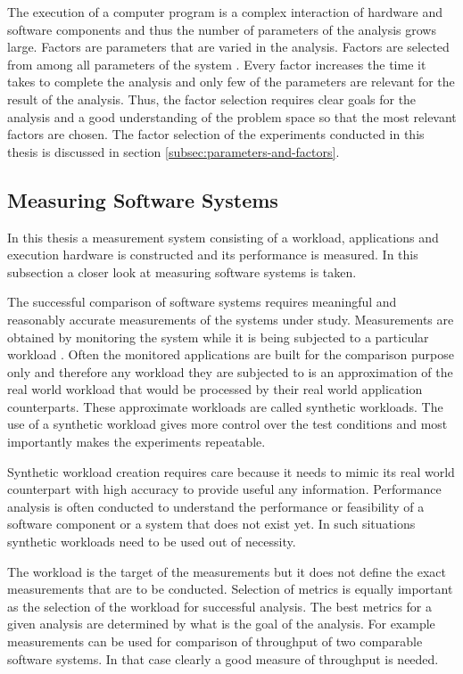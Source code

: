 The execution of a computer program is a complex interaction of hardware and software components and thus the number of parameters of the analysis grows large. Factors are parameters that are varied in the analysis. Factors are selected from among all parameters of the system \cite{jain1991art}. Every factor increases the time it takes to complete the analysis and only few of the parameters are relevant for the result of the analysis. Thus, the factor selection requires clear goals for the analysis and a good understanding of the problem space so that the most relevant factors are chosen. The factor selection of the experiments conducted in this thesis is discussed in section \ref{subsec:parameters-and-factors}.

\subsection{Measuring Software Systems}
\label{subsec:measuring-software}
In this thesis a measurement system consisting of a workload, applications and execution hardware is constructed and its performance is measured. In this subsection a closer look at measuring software systems is taken.

The successful comparison of software systems requires meaningful and reasonably accurate measurements of the systems under study. Measurements are obtained by monitoring the system while it is being subjected to a particular workload \cite{jain1991art}. Often the monitored applications are built for the comparison purpose only and therefore any workload they are subjected to is an approximation of the real world workload that would be processed by their real world application counterparts. These approximate workloads are called synthetic workloads. The use of a synthetic workload gives more control over the test conditions and most importantly makes the experiments repeatable.~\cite{jain1991art}

Synthetic workload creation requires care because it needs to mimic its real world counterpart with high accuracy to provide useful any information. Performance analysis is often conducted to understand the performance or feasibility of a software component or a system that does not exist yet. In such situations synthetic workloads need to be used out of necessity.  

The workload is the target of the measurements but it does not define the exact measurements that are to be conducted. Selection of metrics is equally important as the selection of the workload for successful analysis. The best metrics for a given analysis are determined by what is the goal of the analysis. \cite{jain1991art} For example measurements can be used for comparison of throughput of two comparable software systems. In that case clearly a good measure of throughput is needed.

